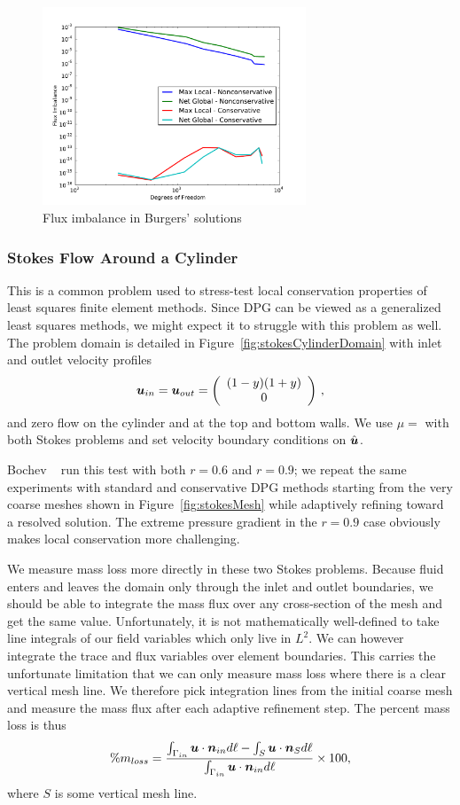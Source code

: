 \documentclass[Proposal.tex]{subfiles}
\begin{document}
\begin{figure}[p]
\centering
\includegraphics[width=0.7\textwidth]{figs/Burgers/graphFlux.pdf}
\caption{Flux imbalance in Burgers' solutions}
\label{fig:burgers_flux}
\end{figure}

\subsubsection{Stokes Flow Around a Cylinder}\label{sec:stokesCylinder}
This is a common problem used to stress-test local conservation properties of
least squares finite element methods. Since DPG can be viewed as a generalized
least squares methods\cite{DPGOverview2}, we might expect it to struggle with
this problem as well. The problem domain is detailed in
Figure~\ref{fig:stokesCylinderDomain} with inlet and outlet velocity profiles
\[
\boldsymbol u_{in}=\boldsymbol u_{out}=\left( \begin{array}{c} (1-y)(1+y)\\ 0\\ \end{array} \right)\,,
\]
and zero flow on the cylinder and at the top and bottom walls. We use $\mu=$
with both Stokes problems and set velocity boundary conditions on $\hat{\boldsymbol u}$.

Bochev \etal~\cite{Bochev2010} run this test with both $r=0.6$ and $r=0.9$; we
repeat the same experiments with standard and conservative DPG methods
starting from the very coarse meshes shown in Figure~\ref{fig:stokesMesh}
while adaptively refining toward a resolved solution. The extreme pressure
gradient in the $r=0.9$ case obviously makes local conservation more
challenging.

We measure mass loss more directly in these two Stokes problems. Because
fluid enters and leaves the domain only through the inlet and outlet
boundaries, we should be able to integrate the mass flux over any
cross-section of the mesh and get the same value. Unfortunately, it is not
mathematically well-defined to take line integrals of our field variables which only
live in $L^2$. We can however integrate the trace and flux variables over element boundaries.
This carries the unfortunate limitation that we can only measure mass loss
where there is a clear vertical mesh line. We therefore pick integration lines
from the initial coarse mesh and measure the mass flux after each adaptive refinement
step. The percent mass loss is thus
\[
\%m_{loss}=\frac{\int_{\Gamma_{in}}\boldsymbol u\cdot\boldsymbol n_{in}d\ell-\int_S\boldsymbol u\cdot\boldsymbol n_Sd\ell}
{\int_{\Gamma_{in}}\boldsymbol u\cdot\boldsymbol n_{in}d\ell}\times100,
\]
where $S$ is some vertical mesh line.
\end{document}
